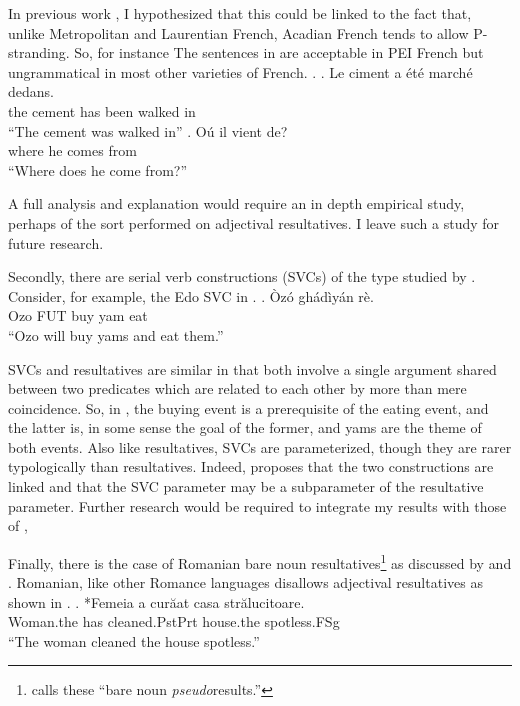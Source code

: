 \documentclass[MilwayThesis]{subfiles}
\begin{document}
In previous work \parencite{milway2015generals}, I hypothesized that this could be linked to the fact that, unlike Metropolitan and Laurentian French, Acadian French tends to allow P-stranding.
So, for instance The sentences in \Next are acceptable in PEI French but ungrammatical in most other varieties of French.
\ex.
\ag. Le ciment a \'{e}t\'{e} march\'{e} dedans.\\
the cement has been walked in\\
``The cement was walked in''
\bg. O\'{u} il vient de?\\
where he comes from\\
``Where does he come from?'' \parencite{roberge2013preposition}

A full analysis and explanation would require an in depth empirical study, perhaps of the sort \textcite{snyder1995language} performed on adjectival resultatives.
I leave such a study for future research.

Secondly, there are serial verb constructions (SVCs) of the type studied by \textcite{stewart2013serial,bakerstewart1999double}.
Consider, for example, the Edo SVC in \Next.
\exg. \`{O}z\'{o}  gh\'{a}d\`{i}y\'{a}n    r\`{e}.\\
Ozo  FUT   buy   yam    eat\\
``Ozo will buy yams and eat them.'' \parencite{bakerstewart1999double}

SVCs and resultatives are similar in that both involve a single argument shared between two predicates which are related to each other by more than mere coincidence.
So, in \Last, the buying event is a prerequisite of the eating event, and the latter is, in some sense the goal of the former, and yams are the theme of both events.
Also like resultatives, SVCs are parameterized, though they are rarer typologically than resultatives.
Indeed, \textcite{stewart2013serial} proposes that the two constructions are linked and that the SVC parameter may be a subparameter of the resultative parameter.
Further research would be required to integrate my results with those of \textcite{stewart2013serial,bakerstewart1999double},

Finally, there is the case of Romanian bare noun resultatives\footnote{\textcite{irimia2012secondary} calls these ``bare noun \textit{pseudo}results.''} as discussed by \textcite[220--224]{irimia2012secondary} and \textcite{farkas2011predicative}.
Romanian, like other Romance languages disallows adjectival resultatives as shown in \Next.
\exg. *Femeia a cur\u{a}at casa str\u{a}lucitoare.\footnotemark\\
Woman.the has cleaned.PstPrt house.the spotless.FSg\\
``The woman cleaned the house spotless.''\parencite{irimia2012secondary}
\end{document}
